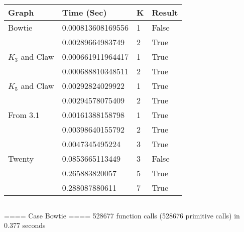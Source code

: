 \documentclass[11pt]{article}
\begin{document}
\subsection{}
\label{subsec:results} %
\begin{center}
\begin{tabu} to 0.8\textwidth { | X[l] X[l] X[c] X[c] | }
\hline
Graph & Time (Sec) & K & Result \\
[0.5ex]
\hline
\hline
Bowtie & 0.000813608169556 & 1 & False \\
[0.3ex]
  & 0.00289664983749 & 2 & True \\
[0.3ex]
\hline
$K_3$ and Claw & 0.000661911964417 & 1 & True \\
[0.3ex]
 & 0.000688810348511 & 2 & True \\
[0.3ex]
\hline
$K_5$ and Claw & 0.00292824029922 & 1 & True \\
[0.3ex]
 & 0.00294578075409 & 2 & True \\
[0.3ex]
\hline
From 3.1 & 0.00161388158798 & 1 & True \\
[0.3ex]
 & 0.00398640155792 & 2 & True \\
[0.3ex]
 & 0.0047345495224 & 3 & True \\
[0.3ex]
\hline
Twenty & 0.0853665113449 & 3 & False \\
[0.3ex]
  & 0.265883820057 & 5 & True \\
[0.3ex]
 & 0.288087880611 & 7 & True \\
[0.3ex]
\hline
\end{tabu}
\end{center}

\subsection{}
\label{subsec:results} %

==== Case Bowtie ====
528677 function calls (528676 primitive calls) in 0.377 seconds
\end{document}
